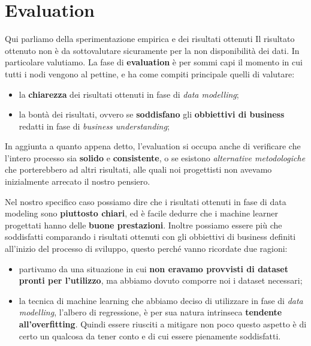 \documentclass[a4paper, 11pt, oneside]{report}
\begin{document}
    \section{Evaluation}
            Qui parliamo della sperimentazione empirica e dei risultati ottenuti
            Il risultato ottenuto non è da sottovalutare sicuramente per la non disponibilità dei dati.
            In particolare valutiamo.
            La fase di \textbf{evaluation} è per sommi capi il momento in cui tutti i nodi vengono al pettine,
            e ha come compiti principale quelli di valutare:
            \begin{itemize}
                \item la \textbf{chiarezza} dei risultati ottenuti in fase di \textit{data modelling};
                \item la bontà dei risultati, ovvero se \textbf{soddisfano} gli \textbf{obbiettivi di business} redatti in
                fase di \textit{business understanding};
            \end{itemize}
            In aggiunta a quanto appena detto, l'evaluation si occupa anche di verificare che l'intero processo sia
            \textbf{solido} e \textbf{consistente}, o se esistono \textit{alternative metodologiche} che porterebbero ad altri risultati,
            alle quali noi progettisti non avevamo inizialmente arrecato il nostro pensiero.
            \par \noindent Nel nostro specifico caso possiamo dire che i risultati ottenuti in fase di data modeling sono
            \textbf{piuttosto chiari}, ed è facile dedurre che i machine learner progettati hanno delle \textbf{buone prestazioni}.
            Inoltre possiamo essere più che soddisfatti comparando i risultati ottenuti con gli obbiettivi di business
            definiti all'inizio del processo di sviluppo, questo perché vanno ricordate due ragioni:
            \begin{itemize}
                \item partivamo da una situazione in cui \textbf{non eravamo provvisti di dataset pronti per l'utilizzo}, ma abbiamo
                dovuto comporre noi i dataset necessari;
                \item la tecnica di machine learning che abbiamo deciso di utilizzare in fase di \textit{data modelling},
                l'albero di regressione, è per sua natura intrinseca \textbf{tendente all'overfitting}.
                Quindi essere riusciti a mitigare non poco questo aspetto è di certo un qualcosa da tener conto e di cui essere
                pienamente soddisfatti.
            \end{itemize}
\end{document}

